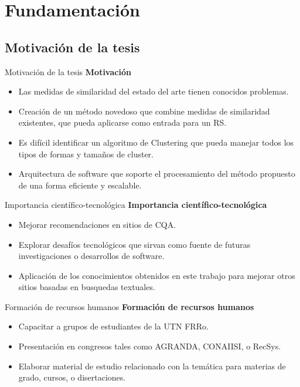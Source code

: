 \section{Fundamentación}

\subsection{Motivación de la tesis}
\begin{frame}{Motivación de la tesis}
	\textbf{Motivación}
	\bigskip
	\begin{itemize} [<+>]
		\item Las medidas de similaridad del estado del arte tienen conocidos problemas.
		\item Creación de un método novedoso que combine medidas de similaridad existentes, que pueda aplicarse como entrada para un RS.
		\item Es difícil identificar un algoritmo de Clustering que pueda manejar todos los tipos de formas y tamaños de cluster.
		\item Arquitectura de software que soporte el procesamiento del método propuesto de una forma eficiente y escalable.
	\end{itemize}
\end{frame}

\begin{frame}{Importancia científico-tecnológica}
	\textbf{Importancia científico-tecnológica}
	\bigskip
	\begin{itemize} [<+>]
		\item Mejorar recomendaciones en sitios de CQA.
		\item Explorar desafíos tecnológicos que sirvan como fuente de futuras investigaciones o desarrollos de software.
		\item Aplicación de los conocimientos obtenidos en este trabajo para mejorar otros sitios basadas en busquedas textuales.
	\end{itemize}
\end{frame}

\begin{frame}{Formación de recursos humanos}
	\textbf{Formación de recursos humanos}
	\bigskip
	\begin{itemize} [<+>]
		\item Capacitar a grupos de estudiantes de la UTN FRRo.
		\item Presentación en congresos tales como AGRANDA, CONAIISI, o RecSys.
		\item Elaborar material de estudio relacionado con la temática para materias de grado, cursos, o disertaciones.
	\end{itemize}
\end{frame}